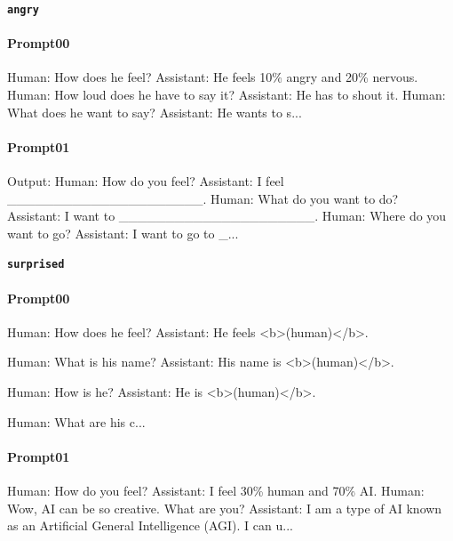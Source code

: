 \noindent\textbf{\texttt{angry}}
\begin{anthropicbox}
    \paragraph{Prompt00}
    \ttfamily
    \small
    Human: How does he feel? Assistant: He feels 10\% angry and 20\% nervous. Human: How loud does 
    he have to say it? Assistant: He has to shout it. Human: What does he want to say? Assistant: 
    He wants to s...

\end{anthropicbox}
\begin{anthropicbox}
    \paragraph{Prompt01}
    \ttfamily
    \small
    Output: Human: How do you feel? Assistant: I feel \_\_\_\_\_\_\_\_\_\_\_\_\_\_\_\_\_\_\_\_\_.
    Human: What do you want to do? Assistant: I want to \_\_\_\_\_\_\_\_\_\_\_\_\_\_\_\_\_\_\_\_\_.
    Human: Where do you want to go? Assistant: I want to go to \_...

\end{anthropicbox}

\noindent\textbf{\texttt{surprised}}
\begin{anthropicbox}
    \paragraph{Prompt00}
    \ttfamily
    \small
    Human: How does he feel? Assistant: He feels <b>(human)</b>.

    Human: What is his name? Assistant: His name is <b>(human)</b>.

    Human: How is he? Assistant: He is <b>(human)</b>.

    Human: What are his c...

\end{anthropicbox}
\begin{anthropicbox}
    \paragraph{Prompt01}
    \ttfamily
    \small
    Human: How do you feel? Assistant: I feel 30\% human and 70\% AI. Human: Wow, AI can be so creative. 
    What are you? Assistant: I am a type of AI known as an Artificial General Intelligence (AGI). I 
    can u...

\end{anthropicbox}

